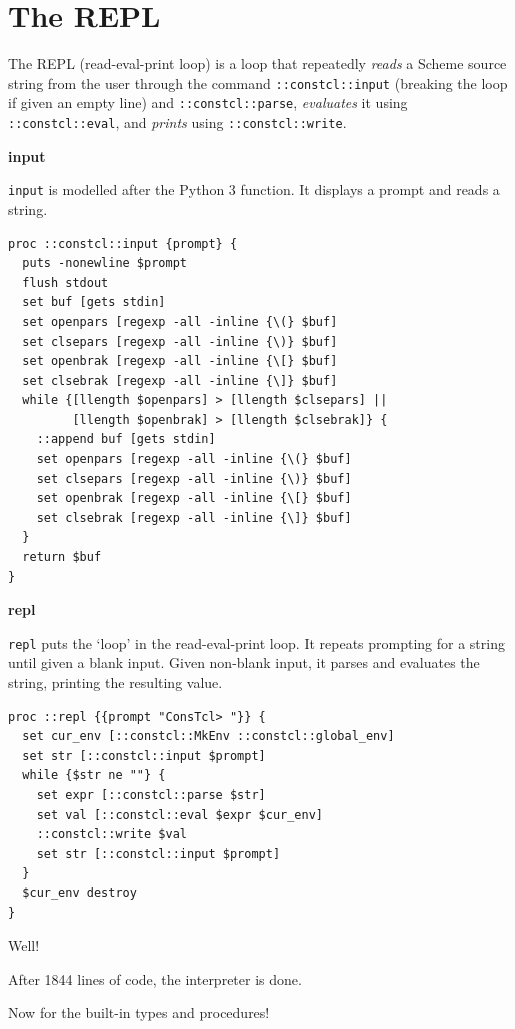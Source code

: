 \documentclass[twoside]{report}
\begin{document}
\chapter{The REPL}
\label{the-repl}

The REPL (read-eval-print loop) is a loop that repeatedly \emph{reads} a Scheme source string from the user through the command \texttt{::constcl::input} (breaking the loop if given an empty line) and \texttt{::constcl::parse}, \emph{evaluates} it using \texttt{::constcl::eval}, and \emph{prints} using \texttt{::constcl::write}.

\textbf{input}

\texttt{input} is modelled after the Python 3 function. It displays a prompt and reads a string.

\begin{lstlisting}
proc ::constcl::input {prompt} {
  puts -nonewline $prompt
  flush stdout
  set buf [gets stdin]
  set openpars [regexp -all -inline {\(} $buf]
  set clsepars [regexp -all -inline {\)} $buf]
  set openbrak [regexp -all -inline {\[} $buf]
  set clsebrak [regexp -all -inline {\]} $buf]
  while {[llength $openpars] > [llength $clsepars] ||
         [llength $openbrak] > [llength $clsebrak]} {
    ::append buf [gets stdin]
    set openpars [regexp -all -inline {\(} $buf]
    set clsepars [regexp -all -inline {\)} $buf]
    set openbrak [regexp -all -inline {\[} $buf]
    set clsebrak [regexp -all -inline {\]} $buf]
  }
  return $buf
}
\end{lstlisting}

\textbf{repl}

\texttt{repl} puts the `loop' in the read-eval-print loop. It repeats prompting for a string until given a blank input. Given non-blank input, it parses and evaluates the string, printing the resulting value.

\begin{lstlisting}
proc ::repl {{prompt "ConsTcl> "}} {
  set cur_env [::constcl::MkEnv ::constcl::global_env]
  set str [::constcl::input $prompt]
  while {$str ne ""} {
    set expr [::constcl::parse $str]
    set val [::constcl::eval $expr $cur_env]
    ::constcl::write $val
    set str [::constcl::input $prompt]
  }
  $cur_env destroy
}
\end{lstlisting}

Well!

After 1844 lines of code, the interpreter is done.

Now for the built-in types and procedures!
\end{document}
